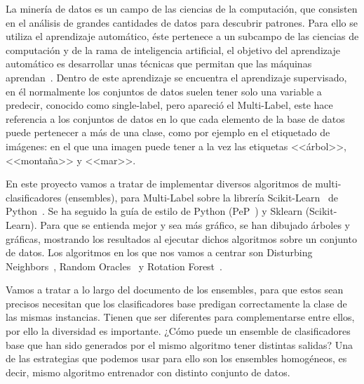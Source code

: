 
La minería de datos es un campo de 	las ciencias de la computación, que consisten en el análisis de grandes cantidades de datos para descubrir patrones.
Para ello se utiliza el aprendizaje automático, éste pertenece a un subcampo de las ciencias de computación y de la rama de inteligencia artificial, el objetivo del aprendizaje automático es desarrollar unas técnicas que permitan que las máquinas aprendan~\cite{wiki:datamining}.
Dentro de este aprendizaje se encuentra el aprendizaje supervisado, en él normalmente los conjuntos de datos suelen tener solo una variable a predecir, conocido como single-label, pero apareció el Multi-Label, este hace referencia a los conjuntos de datos en lo que cada elemento de la base de datos puede pertenecer a más de una clase, como por ejemplo en el etiquetado de imágenes: en el que una imagen puede tener a la vez las etiquetas <<árbol>>, <<montaña>> y <<mar>>.

En este proyecto vamos a tratar de implementar diversos algoritmos de multi-clasificadores (ensembles), para Multi-Label sobre la librería Scikit-Learn~\cite{scikitlearn} de Python~\cite{python}. Se ha seguido la guía de estilo de Python (PeP~\cite{pep}) y Sklearn (Scikit-Learn). Para que se entienda mejor y sea más gráfico, se han dibujado árboles y gráficas, mostrando los resultados al ejecutar dichos algoritmos sobre un conjunto de datos. Los algoritmos en los que nos vamos a centrar son Disturbing Neighbors~\cite{disturbingneighbors}, Random Oracles~\cite{randomoracles} y Rotation Forest~\cite{rotationforest}.

Vamos a tratar a lo largo del documento de los ensembles, para que estos sean precisos necesitan que los clasificadores base predigan correctamente la clase de las mismas instancias.
Tienen que ser diferentes para complementarse entre ellos, por ello la diversidad es importante. 
¿Cómo puede un ensemble de clasificadores base que han sido generados por el mismo algoritmo tener distintas salidas? Una de las estrategias que podemos usar para ello son los ensembles homogéneos, es decir, mismo algoritmo entrenador con distinto conjunto de datos.

